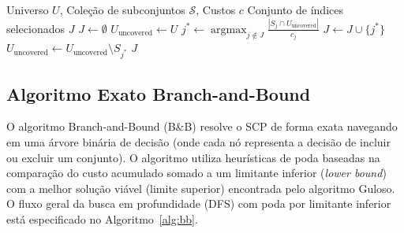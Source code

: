 \documentclass[conference]{IEEEtran}
\begin{document}
\begin{algorithm}
\caption{Heurística Gulosa para o SCP}
\label{alg:greedy}
\begin{algorithmic}[1]
\REQUIRE Universo $U$, Coleção de subconjuntos $\mathcal{S}$, Custos $c$
\ENSURE Conjunto de índices selecionados $J$
\STATE $J \leftarrow \emptyset$
\STATE $U_{\text{uncovered}} \leftarrow U$
    \STATE $j^* \leftarrow \operatorname{argmax}_{j \notin J} \frac{|S_j \cap U_{\text{uncovered}}|}{c_j}$
    \STATE $J \leftarrow J \cup \{j^*\}$
    \STATE $U_{\text{uncovered}} \leftarrow U_{\text{uncovered}} \setminus S_{j^*}$
\ENDWHILE
\RETURN $J$
\end{algorithmic}
\end{algorithm}

\subsection{Algoritmo Exato Branch-and-Bound}
O algoritmo Branch-and-Bound (B\&B) resolve o SCP de forma exata navegando em uma árvore binária de decisão (onde cada nó representa a decisão de incluir ou excluir um conjunto). O algoritmo utiliza heurísticas de poda baseadas na comparação do custo acumulado somado a um limitante inferior (\textit{lower bound}) com a melhor solução viável (limite superior) encontrada pelo algoritmo Guloso. O fluxo geral da busca em profundidade (DFS) com poda por limitante inferior está especificado no Algoritmo~\ref{alg:bb}.
\end{document}
